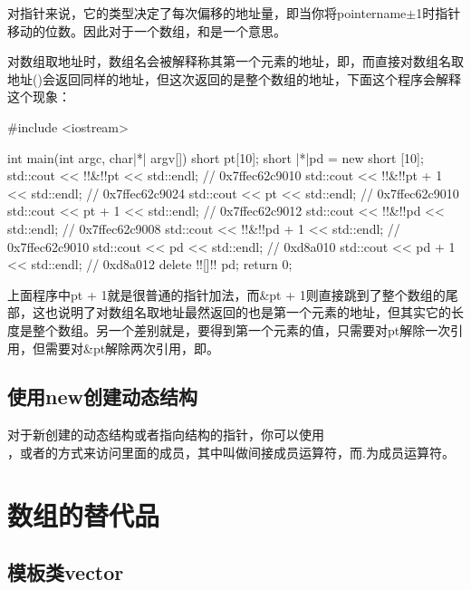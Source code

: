 对指针来说，它的类型决定了每次偏移的地址量，即当你将pointername\thinspace$\pm$\thinspace1时指针移动的位数。因此对于一个数组，和是一个意思。

对数组取地址时，数组名会被解释称其第一个元素的地址，即，而直接对数组名取地址()会返回同样的地址，但这次返回的是整个数组的地址，下面这个程序会解释这个现象：

\begin{cpp}
#include <iostream>

int main(int argc, char|*| argv[]) {
    short pt[10];
    short |*|pd = new short [10];
    std::cout << !!&!!pt << std::endl; // 0x7ffec62c9010
    std::cout << !!&!!pt + 1 << std::endl; // 0x7ffec62c9024
    std::cout << pt << std::endl; // 0x7ffec62c9010
    std::cout << pt + 1 << std::endl; // 0x7ffec62c9012
    std::cout << !!&!!pd << std::endl; // 0x7ffec62c9008
    std::cout << !!&!!pd + 1 << std::endl; // 0x7ffec62c9010
    std::cout << pd << std::endl; // 0xd8a010
    std::cout << pd + 1 << std::endl; // 0xd8a012
    delete !![]!! pd;
    return 0;
}
\end{cpp}

上面程序中pt + 1就是很普通的指针加法，而\&pt + 1则直接跳到了整个数组的尾部，这也说明了对数组名取地址最然返回的也是第一个元素的地址，但其实它的长度是整个数组。另一个差别就是，要得到第一个元素的值，只需要对pt解除一次引用，但需要对\&pt解除两次引用，即。

\addtocounter{subsection}{1}

\subsection{使用new创建动态结构}

对于新创建的动态结构或者指向结构的指针，你可以使用\\ ，或者的方式来访问里面的成员，其中\thinspace\fira{->}\thinspace 叫做间接成员运算符，而.为成员运算符。

\addtocounter{section}{1}

\section{数组的替代品}

\subsection{模板类vector}

